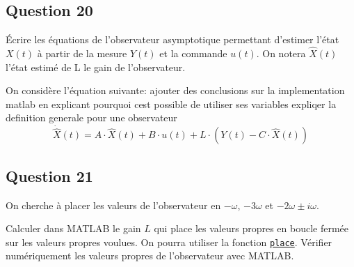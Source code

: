 \documentclass[class=article, crop=false]{standalone}
\begin{document}
\newpage
\subsection{Question 20}
\begin{exercise}
    Écrire les équations de l'observateur asymptotique permettant d'estimer l'état $X(t)$ à partir de la mesure $Y(t)$ et la commande $u(t)$. On notera $\hat{X}(t)$ l'état estimé de L le gain de l'observateur.
\end{exercise}
\begin{resolution}
    On considère l'équation suivante:
    ajouter des conclusions sur la implementation matlab en explicant pourquoi cest possible de utiliser ses variables
    expliqer la definition generale pour une observateur
    \begin{equation}
        \dot{\hat{X}}(t) = A \cdot \hat{X}(t) + B \cdot u(t) + L \cdot (Y(t) - C \cdot \hat{X}(t))
    \end{equation}
\end{resolution}

\newpage
\subsection{Question 21}
On cherche à placer les valeurs de l'observateur en $-\omega$, $-3\omega$ et $-2\omega \pm i\omega$.
\begin{exercise}
    Calculer dans MATLAB le gain $L$ qui place les valeurs propres en boucle fermée sur les valeurs propres voulues. On pourra utiliser la fonction \href{https://www.mathworks.com/help/control/ref/place.html}{\texttt{place}}. Vérifier numériquement les valeurs propres de l'observateur avec MATLAB.
\end{exercise}
\begin{resolution}
\end{resolution}

\newpage
\end{document}
